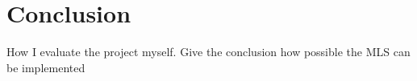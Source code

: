 
\chapter{Conclusion} %

\label{ch:conclusion} %

How I evaluate the project myself.
Give the conclusion how possible the MLS can be implemented
